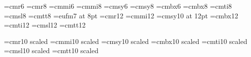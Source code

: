 \font\sixrm=cmr6   \font\eightrm=cmr8  
\font\sixi=cmmi6   \font\eighti=cmmi8  
\font\sixsy=cmsy6  \font\eightsy=cmsy8 
\font\sixbf=cmbx6  \font\eightbf=cmbx8 
                   \font\eightit=cmti8 
                   \font\eightsl=cmsl8 
                   \font\eighttt=cmtt8 
                   \font\eightfrak=eufm7 at 8pt
%
\def\eightpoint{\def\rm{\fam0\eightrm}%
 \textfont0=\eightrm \scriptfont0=\sixrm \scriptscriptfont0=\fiverm
 \textfont1=\eighti \scriptfont1=\sixi \scriptscriptfont1=\fivei
 \textfont2=\eightsy \scriptfont2=\sixsy \scriptscriptfont2=\fivesy
 \textfont3=\tenex \scriptfont3=\tenex \scriptscriptfont3=\tenex
 \textfont\itfam=\eightit \def\it{\fam\itfam\eightit}%
 \textfont\slfam=\eightsl \def\sl{\fam\slfam\eightsl}%
 \textfont\ttfam=\eighttt \def\tt{\fam\ttfam\eighttt}%
 \textfont\frakfam=\eightfrak \def\frak{\fam\frakfam\tenfrak}%
 \textfont\bffam=\eightbf \scriptfont\bffam=\sixbf
 \scriptscriptfont\bffam=\fivebf \def\bf{\fam\bffam\eightbf}%
 \normalbaselineskip=9pt
 \setbox\strutbox=\hbox{\vrule height7pt depth2pt width0pt}%
 \let\sc=\sixrm \let\big=\eightbig \normalbaselines\rm}
%
\font\twelverm=cmr12
\font\twelvei=cmmi12
\font\twelvesy=cmsy10 at 12pt
\font\twelvebf=cmbx12
\font\twelveit=cmti12
\font\twelvesl=cmsl12
\font\twelvett=cmtt12
%
\def\twelvepoint{\def\rm{\fam0\twelverm}%
 \textfont0=\twelverm \scriptfont0=\eightrm \scriptscriptfont0=\sixrm
 \textfont1=\twelvei \scriptfont1=\eighti \scriptscriptfont1=\sixi
 \textfont2=\twelvesy \scriptfont2=\eightsy \scriptscriptfont2=\sixsy
 \textfont3=\tenex \scriptfont3=\tenex \scriptscriptfont3=\tenex
 \textfont\itfam=\twelveit \def\it{\fam\itfam\twelveit}%
 \textfont\slfam=\twelvesl \def\sl{\fam\slfam\twelvesl}%
 \textfont\ttfam=\twelvett \def\tt{\fam\ttfam\twelvett}%
 \textfont\bffam=\twelvebf \scriptfont\bffam=\eightbf
 \scriptscriptfont\bffam=\sixbf \def\bf{\fam\bffam\twelvebf}%
 \normalbaselineskip=14pt
 \setbox\strutbox=\hbox{\vrule height10pt depth4pt width0pt}%
 \let\sc=\tenrm \let\big=\twelvebig \normalbaselines\rm}

\font\tenBigrm=cmr10 scaled
\font\tenBigi=cmmi10 scaled
\font\tenBigsy=cmsy10 scaled
\font\tenBigbf=cmbx10 scaled
\font\tenBigit=cmti10 scaled
\font\tenBigsl=cmsl10 scaled
\font\tenBigtt=cmtt10 scaled
%
\def\tenBigpoint{\def\rm{\fam0\tenBigrm}%
 \textfont0=\tenBigrm \scriptfont0=\tenrm \scriptscriptfont0=\sevenrm
 \textfont1=\tenBigi \scriptfont1=\teni \scriptscriptfont1=\seveni
 \textfont2=\tenBigsy \scriptfont2=\tensy \scriptscriptfont2=\sevensy
 \textfont3=\tenex \scriptfont3=\tenex \scriptscriptfont3=\tenex
 \textfont\itfam=\tenBigit \def\it{\fam\itfam\tenBigit}%
 \textfont\slfam=\tenBigsl \def\sl{\fam\slfam\tenBigsl}%
 \textfont\ttfam=\tenBigtt \def\tt{\fam\ttfam\tenBigtt}%
 \textfont\bffam=\tenBigbf \scriptfont\bffam=\tenbf
 \scriptscriptfont\bffam=\sevenbf \def\bf{\fam\bffam\tenBigbf}%
 \normalbaselineskip=17.3pt
 \setbox\strutbox=\hbox{\vrule height12.2pt depth5pt width0pt}%
 \let\sc=\twelverm \let\big=\tenBigbig \normalbaselines\rm}

